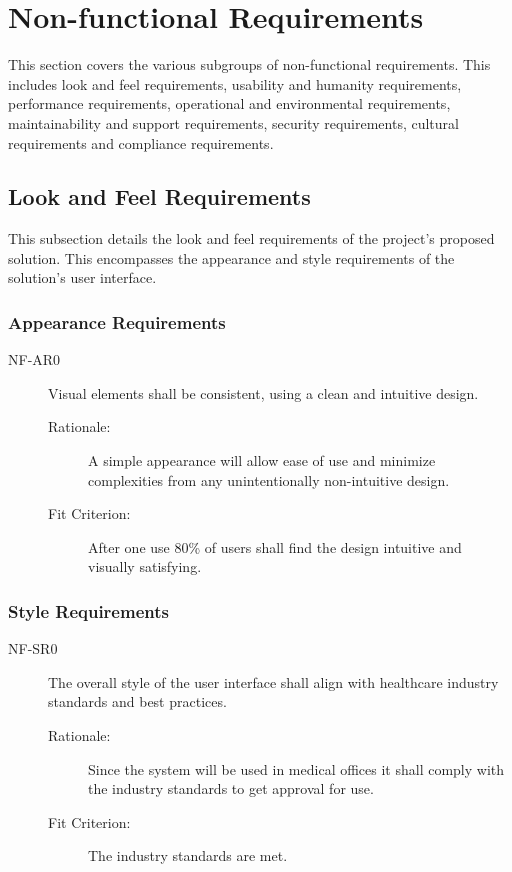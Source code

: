 \documentclass[12pt]{article}
\begin{document}
\section{Non-functional Requirements}
This section covers the various subgroups of non-functional requirements. This includes
look and feel requirements, usability and humanity requirements, performance requirements,
operational and environmental requirements, maintainability and support requirements,
security requirements, cultural requirements and compliance requirements.

\subsection{Look and Feel Requirements}
This subsection details the look and feel requirements of the project's proposed solution.
This encompasses the appearance and style requirements of the solution's user interface.

\subsubsection{Appearance Requirements}
\begin{description}
    \item[NF-AR0] Visual elements shall be consistent, using a clean and intuitive design.
    \begin{description}
        \item[Rationale:] A simple appearance will allow ease of use and minimize complexities from any unintentionally non-intuitive design.
        \item[Fit Criterion:] After one use 80\% of users shall find the design intuitive and visually satisfying.
    \end{description}
\end{description}

\subsubsection{Style Requirements}
\begin{description}
    \item[NF-SR0] The overall style of the user interface shall align with healthcare industry standards and best practices. 
    \begin{description}
        \item[Rationale:] Since the system will be used in medical offices it shall comply with the industry standards to get approval for use.
        \item[Fit Criterion:] The industry standards are met.
    \end{description}
\end{description}
\end{document}
